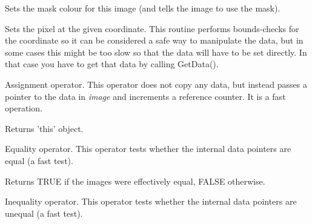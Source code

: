 \label{wximagesetmaskcolour}


Sets the mask colour for this image (and tells the image to use the mask).

\label{wximagesetrgb}


Sets the pixel at the given coordinate. This routine performs bounds-checks
for the coordinate so it can be considered a safe way to manipulate the
data, but in some cases this might be too slow so that the data will have to
be set directly. In that case you have to get that data by calling GetData().



Assignment operator. This operator does not copy any data, but instead
passes a pointer to the data in {\it image} and increments a reference
counter. It is a fast operation.




Returns 'this' object.



Equality operator. This operator tests whether the internal data pointers are
equal (a fast test).




Returns TRUE if the images were effectively equal, FALSE otherwise.



Inequality operator. This operator tests whether the internal data pointers are
unequal (a fast test).

